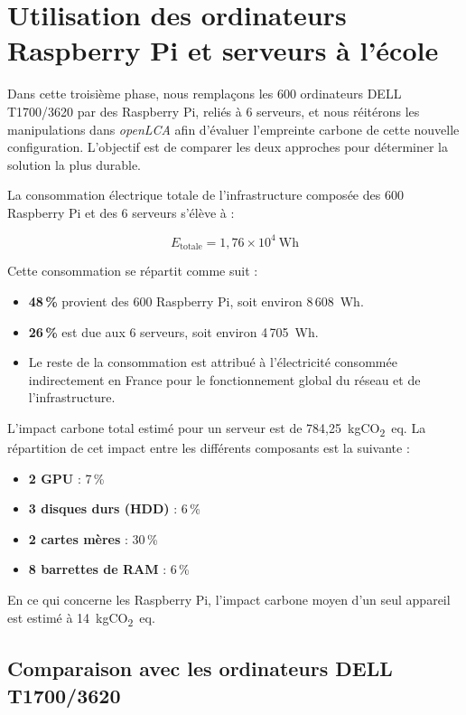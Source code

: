 \section{Utilisation des ordinateurs Raspberry Pi et serveurs à l'école}

Dans cette troisième phase, nous remplaçons les 600 ordinateurs DELL T1700/3620 par des Raspberry Pi, reliés à 6 serveurs, et nous réitérons les manipulations dans \textit{openLCA} afin d’évaluer l’empreinte carbone de cette nouvelle configuration. L’objectif est de comparer les deux approches pour déterminer la solution la plus durable.

La consommation électrique totale de l’infrastructure composée des 600 Raspberry Pi et des 6 serveurs s’élève à :

\[
E_{\text{totale}} = 1{,}76 \times 10^4~\text{Wh}
\]

Cette consommation se répartit comme suit :
\begin{itemize}
    \item \textbf{48\,\%} provient des 600 Raspberry Pi, soit environ 8\,608~Wh.
    \item \textbf{26\,\%} est due aux 6 serveurs, soit environ 4\,705~Wh.
    \item Le reste de la consommation est attribué à l'électricité consommée indirectement en France pour le fonctionnement global du réseau et de l'infrastructure.
\end{itemize}

L’impact carbone total estimé pour un serveur est de 784,25~kgCO\textsubscript{2}~eq. La répartition de cet impact entre les différents composants est la suivante :
\begin{itemize}
    \item \textbf{2 GPU} : 7\,\%
    \item \textbf{3 disques durs (HDD)} : 6\,\%
    \item \textbf{2 cartes mères} : 30\,\%
    \item \textbf{8 barrettes de RAM} : 6\,\%
\end{itemize}

En ce qui concerne les Raspberry Pi, l’impact carbone moyen d’un seul appareil est estimé à 14~kgCO\textsubscript{2}~eq.



\subsection*{Comparaison avec les ordinateurs DELL T1700/3620}

